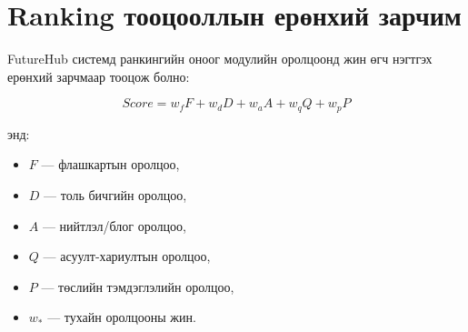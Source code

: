 \section*{Ranking тооцооллын ерөнхий зарчим}

FutureHub системд ранкингийн оноог модулийн оролцоонд жин өгч нэгтгэх ерөнхий зарчмаар тооцож болно:

\[
Score = w_fF + w_dD + w_aA + w_qQ + w_pP
\]

энд:

\begin{itemize}
  \item $F$ — флашкартын оролцоо,
  \item $D$ — толь бичгийн оролцоо,
  \item $A$ — нийтлэл/блог оролцоо,
  \item $Q$ — асуулт-хариултын оролцоо,
  \item $P$ — төслийн тэмдэглэлийн оролцоо,
  \item $w_*$ — тухайн оролцооны жин.
\end{itemize}

